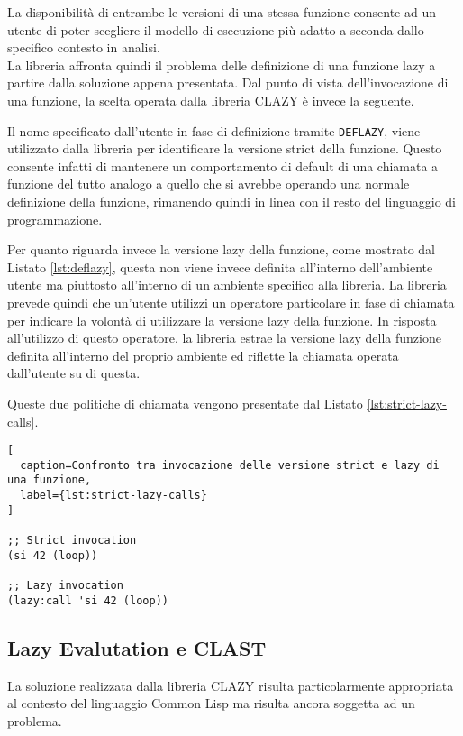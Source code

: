 La disponibilità di entrambe le versioni di una stessa funzione consente ad un
utente di poter scegliere il modello di esecuzione più adatto a seconda dallo
specifico contesto in analisi.\\

La libreria affronta quindi il problema delle definizione di una funzione lazy a
partire dalla soluzione appena presentata. Dal punto di vista dell'invocazione
di una funzione, la scelta operata dalla libreria CLAZY è invece la seguente.

Il nome specificato dall'utente in fase di definizione tramite \texttt{DEFLAZY},
viene utilizzato dalla libreria per identificare la versione strict della
funzione. Questo consente infatti di mantenere un comportamento di default di
una chiamata a funzione del tutto analogo a quello che si avrebbe operando una
normale definizione della funzione, rimanendo quindi in linea con il resto del
linguaggio di programmazione.

Per quanto riguarda invece la versione lazy della funzione, come mostrato dal
Listato \ref{lst:deflazy}, questa non viene invece definita all'interno
dell'ambiente utente ma piuttosto all'interno di un ambiente specifico alla
libreria. La libreria prevede quindi che un'utente utilizzi un operatore
particolare in fase di chiamata per indicare la volontà di utilizzare la
versione lazy della funzione. In risposta all'utilizzo di questo operatore, la
libreria estrae la versione lazy della funzione definita all'interno del proprio
ambiente ed riflette la chiamata operata dall'utente su di questa.

Queste due politiche di chiamata vengono presentate dal Listato
\ref{lst:strict-lazy-calls}.

\begin{lstlisting}[
  caption=Confronto tra invocazione delle versione strict e lazy di una funzione,
  label={lst:strict-lazy-calls}
]

;; Strict invocation
(si 42 (loop))

;; Lazy invocation
(lazy:call 'si 42 (loop))

\end{lstlisting}

\subsection{Lazy Evalutation e CLAST}

La soluzione realizzata dalla libreria CLAZY risulta particolarmente appropriata
al contesto del linguaggio Common Lisp ma risulta ancora soggetta ad un
problema.

